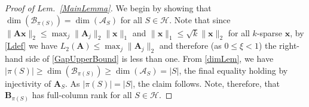 \documentclass[journal, twocolumn]{IEEEtran}
\begin{document}
\begin{proof}[Proof of Lem.~\ref{MainLemma}]
We begin by showing that $\dim(\bm{\mathcal{B}}_{\pi(S)}) = \dim(\bm{\mathcal{A}}_S)$ for all $S \in \mathcal{H}$. Note that since $\|\mathbf{A}\mathbf{x}\|_2 \leq \max_j\|\mathbf{A}_j\|_2\|\mathbf{x}\|_1$ and $\|\mathbf{x}\|_1 \leq \sqrt{k} \|\mathbf{x}\|_2$ for all $k$-sparse $\mathbf{x}$, by \eqref{Ldef} we have $L_2(\mathbf{A}) \leq \max_j\|\mathbf{A}_j\|_2$ and therefore (as $0 \leq \xi < 1$) the right-hand side of \eqref{GapUpperBound} is less than one. From \eqref{dimLem}, we have $|\pi(S)| \geq \dim(\bm{\mathcal{B}}_{\pi(S)}) \geq \dim(\bm{\mathcal{A}}_S) = |S|$, the final equality holding by injectivity of $\mathbf{A}_S$. As $|\pi(S)| = |S|$, the claim follows. Note, therefore, that $\mathbf{B}_{\pi(S)}$ has full-column rank for all $S \in \mathcal{H}$.


\end{proof}
\end{document}
